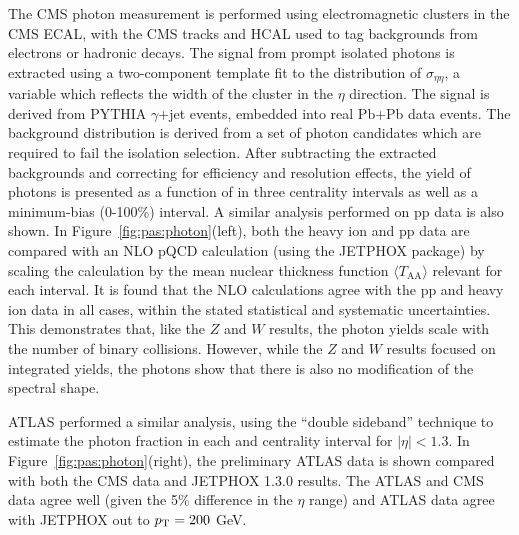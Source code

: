 The CMS photon measurement is performed using electromagnetic clusters in the CMS ECAL, with the
CMS tracks and HCAL used to tag backgrounds from electrons or hadronic decays.  
The signal from prompt isolated photons is extracted using a two-component template fit to
the distribution of $\sigma_{\eta\eta}$, a variable which reflects the width of the cluster
in the $\eta$ direction.  The signal is derived from PYTHIA $\gamma$+jet events, embedded 
into real Pb+Pb data events.  The background distribution is derived from a set of photon
candidates which are required to fail the isolation selection.
After subtracting the extracted backgrounds and correcting for efficiency and resolution
effects, the yield of photons is presented as a function of \pT in three centrality intervals
as well as a minimum-bias (0-100\%) interval.  A similar analysis performed on pp data is
also shown.
In Figure~\ref{fig:pas:photon}(left), 
both the heavy ion and pp data are compared with an NLO pQCD calculation (using the
JETPHOX package) by scaling the calculation by the mean nuclear
thickness function $\langle T_{\mathrm{AA}} \rangle$ relevant for each interval.
It is found that the NLO calculations agree with the pp and heavy ion data in all cases, within
the stated statistical and systematic uncertainties.  This demonstrates that, like the 
$Z$ and $W$ results, the photon yields scale with the number of binary collisions.
However, while the $Z$ and $W$ results focused on integrated yields, the photons show that
there is also no modification of the spectral shape.

ATLAS performed a similar analysis, using the ``double sideband'' technique to estimate the
photon fraction in each \pT and centrality interval for $|\eta|<1.3$.  
In Figure~\ref{fig:pas:photon}(right), the preliminary ATLAS data is shown compared with both 
the CMS data and JETPHOX 1.3.0 results.  The ATLAS and CMS data agree well (given the 5\%
difference in the $\eta$ range) and ATLAS data agree with JETPHOX out to $\mbox{$p_{\mathrm{T}}$} = 200$ GeV.


